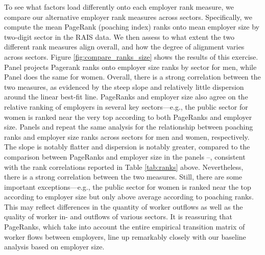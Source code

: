 To see what factors load differently onto each employer rank measure, we compare our alternative employer rank measures across sectors. Specifically, we compute the mean PageRank (poaching index) ranks onto mean employer size by two-digit sector in the RAIS data. We then assess to what extent the two different rank measures align overall, and how the degree of alignment varies across sectors. Figure \ref{fig:compare_ranks_size} shows the results of this exercise. Panel  projects Pagerank ranks onto employer size ranks by sector for men, while Panel  does the same for women. Overall, there is a strong correlation between the two measures, as evidenced by the steep slope and relatively little dispersion around the linear best-fit line. PageRanks and employer size also agree on the relative ranking of employers in several key sectors---e.g., the public sector for women is ranked near the very top according to both PageRanks and employer size. Panels  and  repeat the same analysis for the relationship between poaching ranks and employer size ranks across sectors for men and women, respectively. The slope is notably flatter and dispersion is notably greater, compared to the comparison between PageRanks and employer size in the panels --, consistent with the rank correlations reported in Table \ref{tab:ranks} above. Nevertheless, there is a strong correlation between the two measures. Still, there are some important exceptions---e.g., the public sector for women is ranked near the top according to employer size but only above average according to poaching ranks. This may reflect differences in the quantity of worker outflows as well as the quality of worker in- and outflows of various sectors. It is reassuring that PageRanks, which take into account the entire empirical transition matrix of worker flows between employers, line up remarkably closely with our baseline analysis based on employer size.
%
